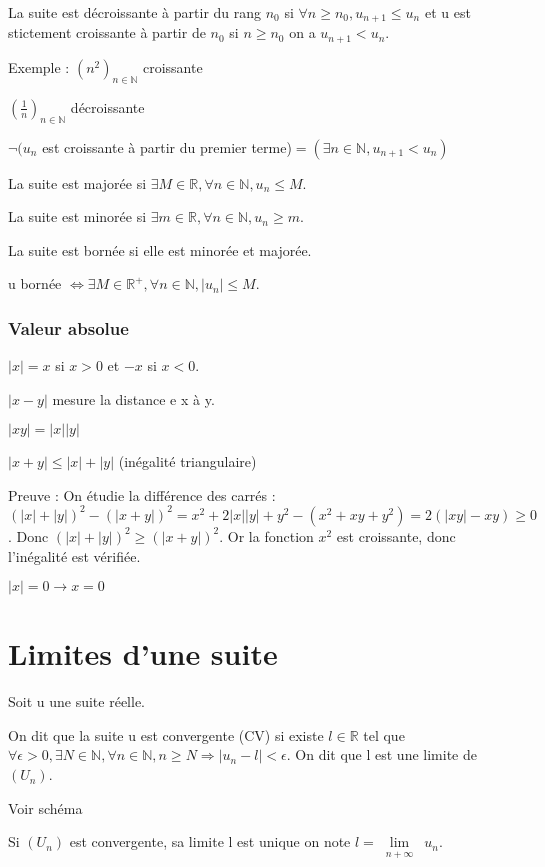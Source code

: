 \documentclass[french]{yLectureNote}
\newcommand{\Lim}[1]{\lim\limits_{\substack{#1}}\:}
\begin{document}
\begin{theorem}
La suite est décroissante à partir du rang $n_0$ si $\forall n\geq n_0, u_{n+1} \leq u_n$ et u est stictement croissante à partir de $n_0$ si $n\geq n_0$ on a $u_{n+1} < u_n$.
\end{theorem}

Exemple : $(n^2)_{n\in\mathbb{N}}$ croissante

$(\frac{1}{n})_{n\in\mathbb{N}}$ décroissante

$\neg(u_n$ est croissante à partir du premier terme)$ = (\exists n\in\mathbb{N}, u_{n+1}<u_n) $

\begin{theorem}
La suite est majorée si $\exists M\in\mathbb{R}, \forall n\in\mathbb{N}, u_n\leq M$.

La suite est minorée si $\exists m\in\mathbb{R}, \forall n\in\mathbb{N}, u_n\geq m$.

La suite est bornée si elle est minorée et majorée.
\end{theorem}

u bornée $\iff \exists M\in \mathbb{R}^+, \forall n\in \mathbb{N}, |u_n|\leq M$.

\subsubsection{Valeur absolue}
$|x| = x$ si $x>0$ et $-x$ si $x<0$.

$|x-y|$ mesure la distance e x à y.

$|xy| = |x||y|$

$|x+y|\leq |x|+|y|$ (inégalité triangulaire)
\begin{myproof}
Preuve : On étudie la différence des carrés : $(|x|+|y|)^2 - (|x+y|)^2 = x^2+2|x||y| + y^2 - (x^2+xy+y^2) = 2(|xy|-xy)\geq 0$. Donc $(|x|+|y|)^2 \geq (|x+y|)^2$. Or la fonction $x^2$ est croissante, donc l'inégalité est vérifiée.
\end{myproof}
$|x| = 0 \rightarrow x =0$


\section{Limites d'une suite}
Soit u une suite réelle.

\begin{theorem}[Définition]
On dit que la suite u est convergente (CV) si existe $l\in\mathbb{R}$ tel que $\forall \epsilon > 0,  \exists N\in\mathbb{N}, \forall n\in\mathbb{N}, n\geq N \Rightarrow  |u_n-l| < \epsilon$. On dit que l est une limite de $(U_n)$.
\end{theorem} Voir schéma
\begin{theorem}
Si $(U_n)$ est convergente, sa limite l est unique on note $l = \Lim{n+\infty} u_n$.
\end{theorem}
\end{document}
